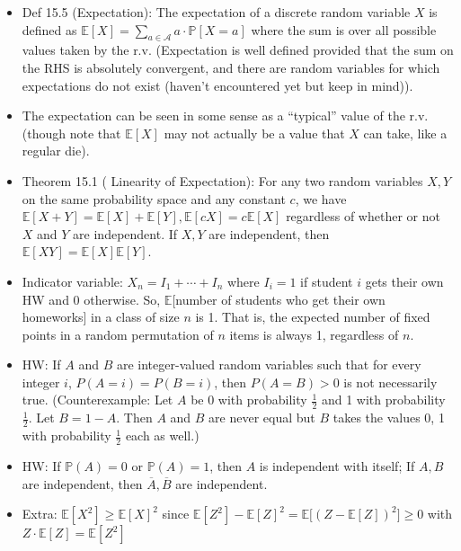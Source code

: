 \documentclass{article}
\begin{document}
\begin{itemize}
	\item Def 15.5 (Expectation): The expectation of a discrete random variable $X$ is defined as $\mathbb{E}[X] = \sum\limits_{a\in\mathscr{A}} a\cdot\mathbb{P}[X=a]$ where the sum is over all possible values taken by the r.v. (Expectation is well defined provided that the sum on the RHS is absolutely convergent, and there are random variables for which expectations do not exist (haven't encountered yet but keep in mind)).
	\item The expectation can be seen in some sense as a ``typical'' value of the r.v. (though note that $\mathbb{E}[X]$ may not actually be a value that $X$ can take, like a regular die).
	\item Theorem 15.1 ({\color{red} Linearity of Expectation}): For any two random variables $X,Y$ on the same probability space and any constant $c$, we have $\mathbb{E}[X+Y] = \mathbb{E}[X] + \mathbb{E}[Y], \mathbb{E}[cX] = c\mathbb{E}[X]$ regardless of whether or not $X$ and $Y$ are independent. If $X,Y$ are independent, then $\mathbb{E}[XY] = \mathbb{E}[X]\mathbb{E}[Y]$.
	\item Indicator variable: $X_n = I_1 + \cdots + I_n$ where $I_i = 1$ if student $i$ gets their own HW and 0 otherwise. So, $\mathbb{E}$[number of students who get their own homeworks] in a class of size $n$ is 1. That is, the expected number of fixed points in a random permutation of $n$ items is always 1, regardless of $n$.
	\item HW: If $A$ and $B$ are integer-valued random variables such that for every integer $i$, $P(A = i) = P(B = i)$, then $P(A = B) > 0$ is not necessarily true. (Counterexample: Let $A$ be 0 with probability $\frac{1}{2}$ and 1 with probability $\frac{1}{2}$. Let $B = 1 - A$. Then $A$ and $B$ are never equal but $B$ takes the values 0, 1 with probability $\frac{1}{2}$ each as well.)
	\item HW: If $\mathbb{P}(A)=0$ or $\mathbb{P}(A)=1$, then $A$ is independent with itself; If $A,B$ are independent, then $\overline{A},\overline{B}$ are independent.
	\item Extra: $\mathbb{E}[X^2]\geq\mathbb{E}[X]^2$ since $\mathbb{E}[Z^2]-\mathbb{E}[Z]^2 = \mathbb{E}\big[(Z-\mathbb{E}[Z])^2\big]\geq0$ with $Z\cdot\mathbb{E}[Z] = \mathbb{E}[Z^2]$
\end{itemize}
\end{document}
